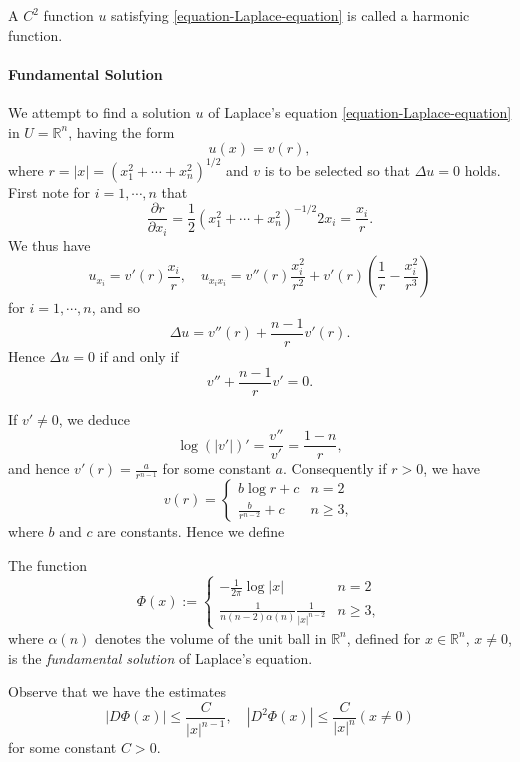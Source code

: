 \begin{definition}
  \label{definition-harmonic-function}
  A \( C^2 \) function \( u \) satisfying \eqref{equation-Laplace-equation} is called a harmonic function.
\end{definition}

\paragraph{Fundamental Solution}

We attempt to find a solution \( u \) of Laplace's equation \eqref{equation-Laplace-equation} in \( U = \mathbb{R}^n \), having the form
\[
  u(x) = v(r),
\]
where \( r = \left\lvert x \right\rvert = (x_1^2 + \cdots + x^2_n)^{1/2} \) and \( v \) is to be selected so that \( \Delta u = 0 \) holds.
First note for \( i = 1, \cdots, n \) that
\[
  \frac{\partial r}{\partial x_i} = \frac{1}{2}(x^2_1 + \cdots + x^2_n)^{-1/2} 2x_i = \frac{x_i}{r}.
\]
We thus have
\[
  u_{x_i} = v'(r) \frac{x_i}{r},\quad u_{x_i x_i} = v''(r)\frac{x_i^2}{r^2} + v'(r)\left( \frac{1}{r} - \frac{x^2_i}{r^3} \right)
\]
for \( i = 1, \cdots, n \), and so
\[
  \Delta u = v''(r) + \frac{n - 1}{r} v'(r).
\]
Hence \( \Delta u = 0 \) if and only if
\begin{equation}
  v'' + \frac{n - 1}{r}v' = 0.
  \label{equation-radial-equivalent-Laplace-equation}
\end{equation}

If \( v' \neq 0 \), we deduce
\[
  \log (\left\lvert v' \right\rvert)' = \frac{v''}{v'} = \frac{1 - n}{r},
\]
and hence \( v'(r) = \frac{a}{r^{n - 1}} \) for some constant \( a \).
Consequently if \( r > 0 \), we have
\[
  v(r) = \begin{cases}
  b \log r + c & n  = 2\\
  \frac{b}{r^{n - 2}} + c & n \geq 3,
  \end{cases}
\]
where \( b \) and \( c \) are constants.
Hence we define
\begin{definition}
  \label{definition-fundamental-solution-Laplace-equation}
  The function
  \[
    \Phi(x) := \begin{cases}
      -\frac{1}{2 \pi} \log \left\lvert x \right\rvert & n = 2\\
      \frac{1}{n(n - 2)\alpha(n)}\frac{1}{\left\lvert x \right\rvert^{n - 2}} & n \geq 3,
    \end{cases}
  \]
  where \( \alpha(n) \) denotes the volume of the unit ball in \( \mathbb{R}^n \), defined for \( x \in \mathbb{R}^n \), \( x \neq 0 \), is the \emph{fundamental solution} of Laplace's equation.
\end{definition}
\begin{remark}
  \label{remark-fundamental-solution-Laplace-equation}
  Observe that we have the estimates
  \[
    \left\lvert D \Phi(x) \right\rvert \leq \frac{C}{\left\lvert x \right\rvert^{n - 1}},\quad \left\lvert D^2 \Phi(x) \right\rvert \leq \frac{C}{\left\lvert x \right\rvert^n} (x \neq 0)
  \]
  for some constant \( C > 0 \).
\end{remark}

